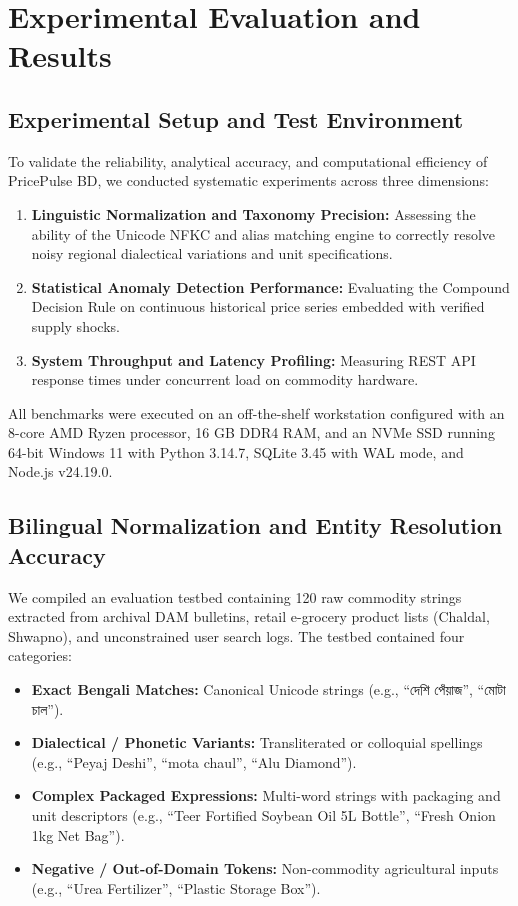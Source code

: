 \chapter{Experimental Evaluation and Results}
\label{ch:evaluation}

\section{Experimental Setup and Test Environment}
To validate the reliability, analytical accuracy, and computational efficiency of PricePulse BD, we conducted systematic experiments across three dimensions:
\begin{enumerate}
    \item \textbf{Linguistic Normalization and Taxonomy Precision:} Assessing the ability of the Unicode NFKC and alias matching engine to correctly resolve noisy regional dialectical variations and unit specifications.
    \item \textbf{Statistical Anomaly Detection Performance:} Evaluating the Compound Decision Rule on continuous historical price series embedded with verified supply shocks.
    \item \textbf{System Throughput and Latency Profiling:} Measuring REST API response times under concurrent load on commodity hardware.
\end{enumerate}

All benchmarks were executed on an off-the-shelf workstation configured with an 8-core AMD Ryzen processor, 16 GB DDR4 RAM, and an NVMe SSD running 64-bit Windows 11 with Python 3.14.7, SQLite 3.45 with WAL mode, and Node.js v24.19.0.

\section{Bilingual Normalization and Entity Resolution Accuracy}
We compiled an evaluation testbed containing 120 raw commodity strings extracted from archival DAM bulletins, retail e-grocery product lists (Chaldal, Shwapno), and unconstrained user search logs. The testbed contained four categories:
\begin{itemize}
    \item \textbf{Exact Bengali Matches:} Canonical Unicode strings (e.g., ``দেশি পেঁয়াজ'', ``মোটা চাল'').
    \item \textbf{Dialectical / Phonetic Variants:} Transliterated or colloquial spellings (e.g., ``Peyaj Deshi'', ``mota chaul'', ``Alu Diamond'').
    \item \textbf{Complex Packaged Expressions:} Multi-word strings with packaging and unit descriptors (e.g., ``Teer Fortified Soybean Oil 5L Bottle'', ``Fresh Onion 1kg Net Bag'').
    \item \textbf{Negative / Out-of-Domain Tokens:} Non-commodity agricultural inputs (e.g., ``Urea Fertilizer'', ``Plastic Storage Box'').
\end{itemize}

